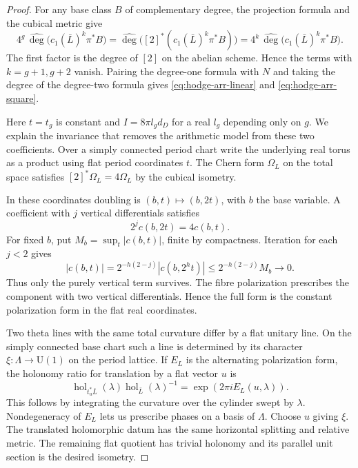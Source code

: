 \begin{proof}
For any base class \(B\) of complementary degree, the projection
formula and the cubical metric give
\[
 4^g\,\widehat{\deg}\bigl(c_1(\bar L)^k\pi^*B\bigr)
  =\widehat{\deg}\bigl([2]^*(c_1(\bar L)^k\pi^*B)\bigr)
  =4^k\,\widehat{\deg}\bigl(c_1(\bar L)^k\pi^*B\bigr).
\]
The first factor is the degree of \([2]\) on the abelian scheme.
Hence the terms with \(k=g+1,g+2\) vanish. Pairing the degree-one formula with
\(N\) and taking the degree of the degree-two formula gives
\eqref{eq:hodge-arr-linear} and \eqref{eq:hodge-arr-square}.

Here \(t=t_g\) is constant and \(I=8\pi l_g d_D\) for a real
\(l_g\) depending only on \(g\). We explain the invariance
that removes the arithmetic model from these two coefficients.
Over a simply connected period chart write the underlying
real torus as a product using flat period coordinates \(t\).
The Chern form \(\Omega_L\) on the total space satisfies
\([2]^*\Omega_L=4\Omega_L\) by the cubical isometry.

In these
coordinates doubling is \((b,t)\mapsto(b,2t)\), with \(b\) the
base variable. A coefficient with \(j\) vertical differentials
satisfies
\[
 2^j c(b,2t)=4c(b,t).
\]
For fixed \(b\), put \(M_b=\sup_t|c(b,t)|\), finite by compactness.
Iteration for each \(j<2\) gives
\[
 |c(b,t)|=2^{-h(2-j)}|c(b,2^h t)|
 \le 2^{-h(2-j)}M_b\longrightarrow0 .
\]
Thus only the purely vertical term survives. The fibre polarization prescribes the component
with two vertical differentials. Hence the full form is the
constant polarization form in the flat real coordinates.

Two theta lines with the same total curvature differ by a flat
unitary line. On the simply connected base chart such a line is
determined by its character \(\xi:\Lambda\to\mathrm U(1)\) on the
period lattice. If \(E_L\) is the alternating polarization form,
the holonomy ratio for translation by a flat vector \(u\) is
\[
 \operatorname{hol}_{t_u^*\bar L}(\lambda)
   \operatorname{hol}_{\bar L}(\lambda)^{-1}
      =\exp(2\pi i E_L(u,\lambda)).
\]
This follows by integrating the curvature over the cylinder swept
by \(\lambda\). Nondegeneracy of \(E_L\) lets us prescribe phases
on a basis of \(\Lambda\). Choose \(u\) giving \(\xi\). The
translated holomorphic datum has the same horizontal splitting
and relative metric. The remaining flat quotient has trivial
holonomy and its parallel unit section is the desired isometry.


\end{proof}
